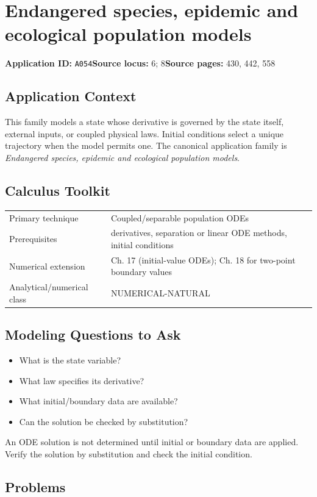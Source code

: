 \documentclass[11pt]{book}
\newcommand{\pid}[1]{\texttt{#1}}
\begin{document}
\chapter{Endangered species, epidemic and ecological population models}\label{app:A054}
\textbf{Application ID:} \pid{A054}\quad \textbf{Source locus:} 6; 8\quad \textbf{Source pages:} 430, 442, 558
\section*{Application Context}
This family models a state whose derivative is governed by the state itself, external inputs, or coupled physical laws. Initial conditions select a unique trajectory when the model permits one. The canonical application family is \emph{Endangered species, epidemic and ecological population models}.
\section*{Calculus Toolkit}
\begin{tabularx}{\textwidth}{@{}lX@{}}\toprule
Primary technique & Coupled/separable population ODEs \\
Prerequisites & derivatives, separation or linear ODE methods, initial conditions \\
Numerical extension & Ch. 17 (initial-value ODEs); Ch. 18 for two-point boundary values \\
Analytical/numerical class & NUMERICAL-NATURAL \\
\bottomrule\end{tabularx}
\section*{Modeling Questions to Ask}\begin{itemize}
\item What is the state variable?
\item What law specifies its derivative?
\item What initial/boundary data are available?
\item Can the solution be checked by substitution?
\end{itemize}
\begin{errorbox}An ODE solution is not determined until initial or boundary data are applied. Verify the solution by substitution and check the initial condition.\end{errorbox}
\section*{Problems}
\end{document}
